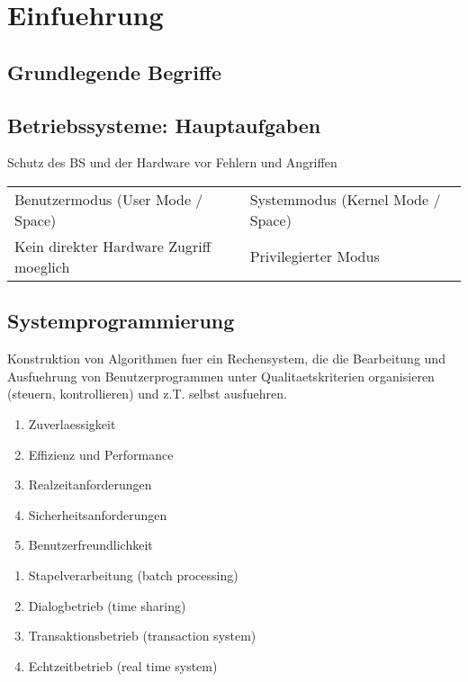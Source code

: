 \chapter{Einfuehrung}
\section{Grundlegende Begriffe}


\section{Betriebssysteme: Hauptaufgaben}
\noindent Schutz des BS und der Hardware vor Fehlern und Angriffen

\begin{longtable}{ll}
	Benutzermodus (User Mode / Space)& Systemmodus (Kernel Mode / Space)\\
	Kein direkter Hardware Zugriff moeglich& Privilegierter Modus\\ 
\end{longtable}


\section{Systemprogrammierung}

\noindent Konstruktion von Algorithmen fuer ein Rechensystem, die die Bearbeitung und Ausfuehrung von Benutzerprogrammen unter Qualitaetskriterien organisieren (steuern, kontrollieren) und z.T. selbst ausfuehren.

\begin{enumerate}
	\setlength\itemsep{0em}
	\item Zuverlaessigkeit
	\item Effizienz und Performance
	\item Realzeitanforderungen
	\item Sicherheitsanforderungen
	\item Benutzerfreundlichkeit
\end{enumerate}

\begin{enumerate}
	\setlength\itemsep{0em}
	\item Stapelverarbeitung (batch processing)
	\item Dialogbetrieb (time sharing)
	\item Transaktionsbetrieb (transaction system)
	\item Echtzeitbetrieb (real time system)
\end{enumerate}

